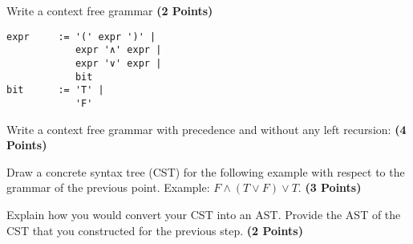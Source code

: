 \documentclass [11pt, a4wide, twoside]{article}
\begin{document}
\begin{myenumerate}
\item Write a context free grammar \textbf{(2 Points)}\vspace{6cm}

\begin{solutionBlock}
\begin{verbatim}
expr     := '(' expr ')' |
            expr '∧' expr |
            expr '∨' expr |
            bit
bit      := 'T' |
            'F'
\end{verbatim}
\end{solutionBlock}


\newpage
\item Write a context free grammar with precedence and without any left recursion: \textbf{(4 Points)}\vspace{6cm}

\begin{comment}
\begin{verbatim}
With precedence:
expr     := expr '∨' exprAnd |
            exprAnd
exprAnd  := exprAnd '∧' exprPar |
            exprPar
exprPar  := '(' expr ')' |
            bit
bit      := 'T' |
            'F'

remove left recursion:
expr     := exprAnd expr'
expr'    := '∨' exprAnd expr' |
            ε
exprAnd  := exprPar exprAnd'
exprAnd' := '∧' exprPar exprAnd' |
            ε
exprPar  := '(' expr ')' |
            bit
bit      := 'T' |
            'F'
\end{verbatim}
\end{comment}


\newpage
\item Draw a concrete syntax tree (CST) for the following example with respect to the grammar of the previous point. 
Example: $F \land (T \lor F) \lor T$. \textbf{(3 Points)}\vspace{8cm}

\begin{comment}
see 3-trees.png
\end{comment}

\newpage


\item Explain how you would convert your CST into an AST. Provide the AST of the CST that you constructed for the previous step. \textbf{(2 Points)} \vspace{7cm}

\begin{comment}
\begin{verbatim}
rewrite CST to AST with and or nodes and true false children by pushing consumed operator in expr' and axprAnd' to parent node (see 3-trees.png)
\end{verbatim}
\end{comment}



\end{myenumerate}
\end{document}
